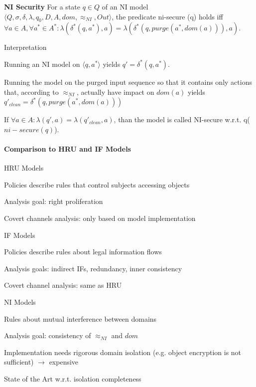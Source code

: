 \documentclass[a4paper]{article}
\renewcommand{\note}[2]{\begin{noteBox} \textbf{#1} #2 \end{noteBox}}
\begin{document}
\begin{multicols}{3}
    \note{NI Security}{For a state $q\in Q$ of an NI model $\langle Q,\sigma,\delta,\lambda,q_0,D,A,dom,\approx_{NI},Out\rangle$, the predicate ni-secure (q) holds iff $\forall a\in A,\forall a^*\in A^*:\lambda (\delta^*(q,a^*),a)=\lambda(\delta^*(q,purge(a^*,dom(a))),a)$.}

    Interpretation
    \begin{enumerate*}
        \item Running an NI model on $\langle q,a^*\rangle$ yields $q'=\delta^*(q,a^*)$.
        \item Running the model on the purged input sequence so that it contains only actions that, according to $\approx_{NI}$, actually have impact on $dom(a)$ yields $q'_{clean}=\delta^*(q,purge(a^*,dom(a)))$
        \item If $\forall a\in A:\lambda(q',a)=\lambda(q'_{clean},a)$, than the model is called NI-secure w.r.t. q($ni-secure(q)$).
    \end{enumerate*}

    \paragraph{Comparison to HRU and IF Models}\hfill

    HRU Models
    \begin{itemize*}
        \item Policies describe rules that control subjects accessing objects
        \item Analysis goal: right proliferation
        \item Covert channels analysis: only based on model implementation
    \end{itemize*}
    IF Models
    \begin{itemize*}
        \item Policies describe rules about legal information flows
        \item Analysis goals: indirect IFs, redundancy, inner consistency
        \item Covert channel analysis: same as HRU
    \end{itemize*}
    NI Models
    \begin{itemize*}
        \item Rules about mutual interference between domains
        \item Analysis goal: consistency of $\approx_{NI}$ and $dom$
        \item Implementation needs rigorous domain isolation (e.g. object encryption is not sufficient) $\rightarrow$ expensive
        \item State of the Art w.r.t. isolation completeness
    \end{itemize*}


\end{multicols}
\end{document}
